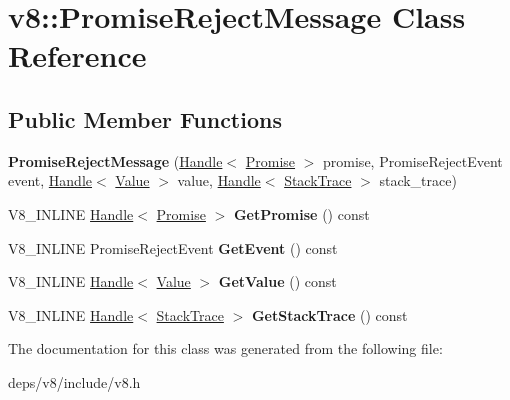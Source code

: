 \hypertarget{classv8_1_1_promise_reject_message}{}\section{v8\+:\+:Promise\+Reject\+Message Class Reference}
\label{classv8_1_1_promise_reject_message}
\subsection*{Public Member Functions}
\begin{DoxyCompactItemize}
\item 
\hypertarget{classv8_1_1_promise_reject_message_adceb7b51206c97c8dc110e455523d7a7}{}{\bfseries Promise\+Reject\+Message} (\hyperlink{classv8_1_1_local}{Handle}$<$ \hyperlink{classv8_1_1_promise}{Promise} $>$ promise, Promise\+Reject\+Event event, \hyperlink{classv8_1_1_local}{Handle}$<$ \hyperlink{classv8_1_1_value}{Value} $>$ value, \hyperlink{classv8_1_1_local}{Handle}$<$ \hyperlink{classv8_1_1_stack_trace}{Stack\+Trace} $>$ stack\+\_\+trace)\label{classv8_1_1_promise_reject_message_adceb7b51206c97c8dc110e455523d7a7}

\item 
\hypertarget{classv8_1_1_promise_reject_message_a4827e57e8e801391fee1fb9ba15219dd}{}V8\+\_\+\+I\+N\+L\+I\+N\+E \hyperlink{classv8_1_1_local}{Handle}$<$ \hyperlink{classv8_1_1_promise}{Promise} $>$ {\bfseries Get\+Promise} () const \label{classv8_1_1_promise_reject_message_a4827e57e8e801391fee1fb9ba15219dd}

\item 
\hypertarget{classv8_1_1_promise_reject_message_a1380024500dac27eb74665701a80c6b0}{}V8\+\_\+\+I\+N\+L\+I\+N\+E Promise\+Reject\+Event {\bfseries Get\+Event} () const \label{classv8_1_1_promise_reject_message_a1380024500dac27eb74665701a80c6b0}

\item 
\hypertarget{classv8_1_1_promise_reject_message_a6460f7a4939dcbaada74edab060fbeca}{}V8\+\_\+\+I\+N\+L\+I\+N\+E \hyperlink{classv8_1_1_local}{Handle}$<$ \hyperlink{classv8_1_1_value}{Value} $>$ {\bfseries Get\+Value} () const \label{classv8_1_1_promise_reject_message_a6460f7a4939dcbaada74edab060fbeca}

\item 
\hypertarget{classv8_1_1_promise_reject_message_afe13309811dec50e9de6ca62f05e318e}{}V8\+\_\+\+I\+N\+L\+I\+N\+E \hyperlink{classv8_1_1_local}{Handle}$<$ \hyperlink{classv8_1_1_stack_trace}{Stack\+Trace} $>$ {\bfseries Get\+Stack\+Trace} () const \label{classv8_1_1_promise_reject_message_afe13309811dec50e9de6ca62f05e318e}

\end{DoxyCompactItemize}


The documentation for this class was generated from the following file\+:\begin{DoxyCompactItemize}
\item 
deps/v8/include/v8.\+h\end{DoxyCompactItemize}
